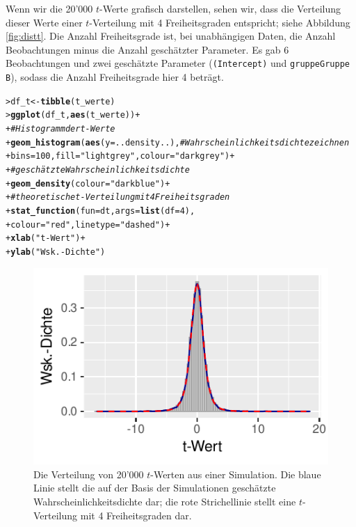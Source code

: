 \documentclass[oneside, 10pt]{book}\usepackage[]{graphicx}\usepackage[]{xcolor}
\makeatletter
\newcommand{\hlnum}[1]{\textcolor[rgb]{0.686,0.059,0.569}{#1}}%
\newcommand{\hlstr}[1]{\textcolor[rgb]{0.192,0.494,0.8}{#1}}%
\newcommand{\hlcom}[1]{\textcolor[rgb]{0.678,0.584,0.686}{\textit{#1}}}%
\newcommand{\hlopt}[1]{\textcolor[rgb]{0,0,0}{#1}}%
\newcommand{\hlstd}[1]{\textcolor[rgb]{0.345,0.345,0.345}{#1}}%
\newcommand{\hlkwb}[1]{\textcolor[rgb]{0.69,0.353,0.396}{#1}}%
\newcommand{\hlkwc}[1]{\textcolor[rgb]{0.333,0.667,0.333}{#1}}%
\newcommand{\hlkwd}[1]{\textcolor[rgb]{0.737,0.353,0.396}{\textbf{#1}}}%
\newenvironment{kframe}{%
 \def\at@end@of@kframe{}%
 \ifinner\ifhmode%
  \def\at@end@of@kframe{\end{minipage}}%
  \begin{minipage}{\columnwidth}%
 \fi\fi%
 \def\FrameCommand##1{\hskip\@totalleftmargin \hskip-\fboxsep
 \colorbox{shadecolor}{##1}\hskip-\fboxsep
     \hskip-\linewidth \hskip-\@totalleftmargin \hskip\columnwidth}%
 \MakeFramed {\advance\hsize-\width
   \@totalleftmargin\z@ \linewidth\hsize
   \@setminipage}}%
 {\par\unskip\endMakeFramed%
 \at@end@of@kframe}
\newenvironment{knitrout}{}{} %
\makeatother
\begin{document}
Wenn wir die 20'000 $t$-Werte grafisch darstellen,
sehen wir, dass die Verteilung dieser Werte einer
$t$-Verteilung mit 4 Freiheitsgraden entspricht; siehe
Abbildung \ref{fig:distt}.
Die Anzahl Freiheitsgrade ist, bei unabhängigen Daten,
die Anzahl Beobachtungen minus die Anzahl geschätzter Parameter.
Es gab 6 Beobachtungen und zwei geschätzte Parameter (\texttt{(Intercept)}
und \texttt{gruppeGruppe B}), sodass die Anzahl Freiheitsgrade
hier 4 beträgt.
\begin{knitrout}
\color{fgcolor}\begin{kframe}
\begin{alltt}
\hlstd{> }\hlstd{df_t} \hlkwb{<-} \hlkwd{tibble}\hlstd{(t_werte)}
\hlstd{> }\hlkwd{ggplot}\hlstd{(df_t,} \hlkwd{aes}\hlstd{(t_werte))} \hlopt{+}
\hlstd{+ }  \hlcom{# Histogramm der t-Werte}
\hlstd{+ }  \hlkwd{geom_histogram}\hlstd{(}\hlkwd{aes}\hlstd{(}\hlkwc{y} \hlstd{= ..density..),} \hlcom{# Wahrscheinlichkeitsdichte zeichnen}
\hlstd{+ }                 \hlkwc{bins} \hlstd{=} \hlnum{100}\hlstd{,} \hlkwc{fill} \hlstd{=} \hlstr{"lightgrey"}\hlstd{,} \hlkwc{colour} \hlstd{=} \hlstr{"darkgrey"}\hlstd{)} \hlopt{+}
\hlstd{+ }  \hlcom{# geschätzte Wahrscheinlichkeitsdichte}
\hlstd{+ }  \hlkwd{geom_density}\hlstd{(}\hlkwc{colour} \hlstd{=} \hlstr{"darkblue"}\hlstd{)} \hlopt{+}
\hlstd{+ }  \hlcom{# theoretische t-Verteilung mit 4 Freiheitsgraden}
\hlstd{+ }  \hlkwd{stat_function}\hlstd{(}\hlkwc{fun} \hlstd{= dt,} \hlkwc{args} \hlstd{=} \hlkwd{list}\hlstd{(}\hlkwc{df} \hlstd{=} \hlnum{4}\hlstd{),}
\hlstd{+ }                \hlkwc{colour} \hlstd{=} \hlstr{"red"}\hlstd{,} \hlkwc{linetype} \hlstd{=} \hlstr{"dashed"}\hlstd{)} \hlopt{+}
\hlstd{+ }  \hlkwd{xlab}\hlstd{(}\hlstr{"t-Wert"}\hlstd{)} \hlopt{+}
\hlstd{+ }  \hlkwd{ylab}\hlstd{(}\hlstr{"Wsk.-Dichte"}\hlstd{)}
\end{alltt}
\end{kframe}\begin{figure}[tp]

{\centering \includegraphics[width=.5\textwidth]{figs/unnamed-chunk-365-1} 

}

\caption{Die Verteilung von 20'000 $t$-Werten aus einer Simulation. Die blaue Linie stellt die auf der Basis der Simulationen geschätzte Wahrscheinlichkeitsdichte dar; die rote Strichellinie stellt eine $t$-Verteilung mit 4 Freiheitsgraden dar.\label{fig:distt}}\label{fig:unnamed-chunk-365}
\end{figure}

\end{knitrout}
\end{document}

